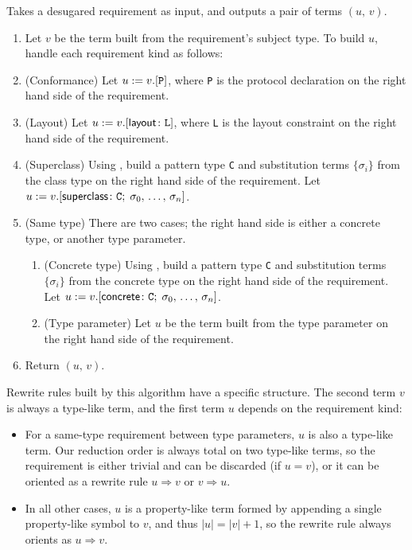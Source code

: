 \documentclass[../generics]{subfiles}
\begin{document}
\begin{algorithm}\label{build rule}
Takes a desugared requirement as input, and outputs a pair of terms $(u,\,v)$.
\begin{enumerate}
\item Let $v$ be the term built from the requirement's subject type. To build $u$, handle each requirement kind as follows:
%
\item (Conformance) Let $u := v.[\texttt{P}]$, where \texttt{P} is the protocol declaration on the right hand side of the requirement.
%
\item (Layout) Let $u := v.[\mathsf{layout}\colon\texttt{L}]$, where \texttt{L} is the layout constraint on the right hand side of the requirement.
%
\item (Superclass) Using , build a pattern type \texttt{C} and substitution terms $\{\sigma_i\}$ from the class type on the right hand side of the requirement. Let $u := v.[\mathsf{superclass}\colon \texttt{C};\;\sigma_0,\,\ldots,\,\sigma_n]$.
%
\item (Same type) There are two cases; the right hand side is either a concrete type, or another type parameter.
\begin{enumerate}
\item (Concrete type) Using , build a pattern type \texttt{C} and substitution terms $\{\sigma_i\}$ from the concrete type on the right hand side of the requirement. Let $u := v.[\mathsf{concrete}\colon \texttt{C};\;\sigma_0,\,\ldots,\,\sigma_n]$.
\item (Type parameter) Let $u$ be the term built from the type parameter on the right hand side of the requirement.
\end{enumerate}
\item Return $(u,\,v)$.
\end{enumerate}
\end{algorithm}
Rewrite rules built by this algorithm have a specific structure. The second term $v$ is always a type-like term, and the first term $u$ depends on the requirement kind:
\begin{itemize}
\item For a same-type requirement between type parameters, $u$ is also a type-like term. Our reduction order is always total on two type-like terms, so the requirement is either trivial and can be discarded (if $u=v$), or it can be oriented as a rewrite rule $u\Rightarrow v$ or $v\Rightarrow u$.
\item In all other cases, $u$ is a property-like term formed by appending a single property-like symbol to $v$, and thus $|u|=|v|+1$, so the rewrite rule always orients as $u\Rightarrow v$.
\end{itemize}
\end{document}
